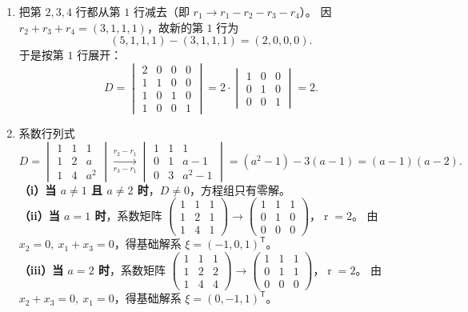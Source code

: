 \documentclass[12pt]{ctexart}
\newcommand{\rank}{\operatorname{r}}
\begin{document}
\begin{enumerate}[label=\textbf{\arabic*.},itemsep=13pt]
\item 把第 $2,3,4$ 行都从第 $1$ 行减去（即 $r_1\to r_1-r_2-r_3-r_4$）。
  因 $r_2+r_3+r_4=(3,1,1,1)$，故新的第 $1$ 行为
  \[
  (5,1,1,1)-(3,1,1,1)=(2,0,0,0).
  \]
  于是按第 $1$ 行展开：
  \[
  D=\begin{vmatrix}
  2&0&0&0\\ 1&1&0&0\\ 1&0&1&0\\ 1&0&0&1
  \end{vmatrix}
  =2\cdot\begin{vmatrix}1&0&0\\0&1&0\\0&0&1\end{vmatrix}=2.
  \]

\item 系数行列式
  \[
  D=\begin{vmatrix}1&1&1\\1&2&a\\1&4&a^{2}\end{vmatrix}
  \xrightarrow[r_3-r_1]{r_2-r_1}
  \begin{vmatrix}1&1&1\\0&1&a-1\\0&3&a^{2}-1\end{vmatrix}
  =(a^{2}-1)-3(a-1)=(a-1)(a-2).
  \]
  \textbf{（i）当 $a\neq1$ 且 $a\neq2$ 时}，$D\neq0$，方程组只有零解。\\[2pt]
  \textbf{（ii）当 $a=1$ 时}，系数矩阵
  $\begin{pmatrix}1&1&1\\1&2&1\\1&4&1\end{pmatrix}\to
  \begin{pmatrix}1&1&1\\0&1&0\\0&0&0\end{pmatrix}$，$\rank=2$。
  由 $x_2=0,\ x_1+x_3=0$，得基础解系 $\xi=(-1,0,1)^{\mathsf T}$。\\[2pt]
  \textbf{（iii）当 $a=2$ 时}，系数矩阵
  $\begin{pmatrix}1&1&1\\1&2&2\\1&4&4\end{pmatrix}\to
  \begin{pmatrix}1&1&1\\0&1&1\\0&0&0\end{pmatrix}$，$\rank=2$。
  由 $x_2+x_3=0,\ x_1=0$，得基础解系 $\xi=(0,-1,1)^{\mathsf T}$。


\end{enumerate}
\end{document}
